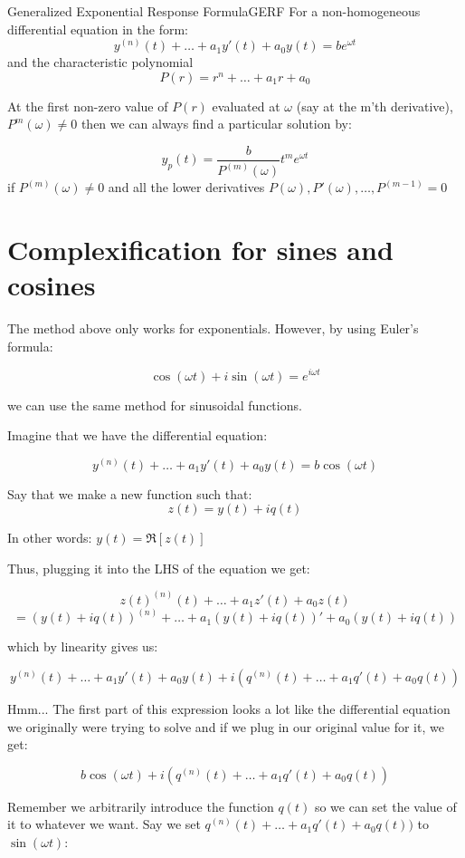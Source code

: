 \documentclass{report}
\begin{document}
\begin{mytheo}{Generalized Exponential Response Formula}{GERF}
    For a non-homogeneous differential equation in the form:
    $$y^{(n)}(t) + \dots + a_1y'(t) + a_0y(t) = be^{\omega t}$$
    and the characteristic polynomial
    $$P(r) = r^n + \dots + a_1r + a_0$$
    
    At the first non-zero value of $P(r)$ evaluated at $\omega$ (say at the m'th derivative), $P^{m}(\omega) \neq 0$ then we can always find a particular solution by:
    
    $$y_p(t) = \frac{b}{P^{(m)}(\omega)} t^me^{\omega t}$$
    if $P^{(m)}(\omega) \neq 0$
    and all the lower derivatives $P(\omega), P'(\omega), \dots, P^{(m-1)} = 0$
    
 
\end{mytheo}

\section{Complexification for sines and cosines}

The method above only works for exponentials. However, by using Euler's formula:

$$\cos(\omega t) + i\sin(\omega t) = e^{i\omega t}$$

we can use the same method for sinusoidal functions.

Imagine that we have the differential equation:

$$y^{(n)}(t) + \dots + a_1y'(t) + a_0y(t) = b\cos(\omega t)$$

Say that we make a new function such that:
$$z(t) = y(t) + iq(t) $$

In other words: $y(t) = \Re[z(t)]$

Thus, plugging it into the LHS of the equation we get:

$$z(t)^{(n)}(t) + \dots + a_1z'(t) + a_0z(t)$$
$$=(y(t) + iq(t))^{(n)} + \dots + a_1(y(t) + iq(t))' + a_0(y(t) + iq(t))$$

which by linearity gives us:

$$y^{(n)}(t) + \dots + a_1y'(t) + a_0y(t) + i(q^{(n)}(t) + \dots + a_1q'(t) + a_0q(t))$$

Hmm... The first part of this expression looks a lot like the differential equation we originally were trying to solve and if we plug in our original value for it, we get:

$$b\cos(\omega t) + i(q^{(n)}(t) + \dots + a_1q'(t) + a_0q(t))$$

Remember we arbitrarily introduce the function $q(t)$ so we can set the value of it to whatever we want. Say we set $q^{(n)}(t) + \dots + a_1q'(t) + a_0q(t))$ to $\sin(\omega t)$:
\end{document}

